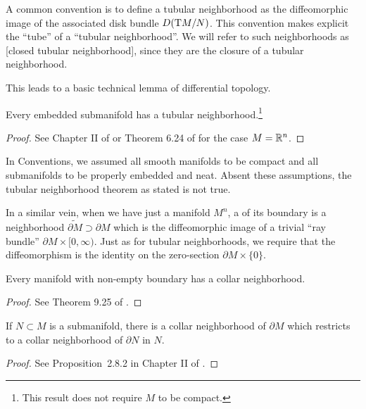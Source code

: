 \begin{remark}
	A common convention is to define a tubular neighborhood as the diffeomorphic image of the associated disk bundle ${D}(\mathrm{T} M/N)$. This convention makes explicit the ``tube'' of a  ``tubular neighborhood''. We will refer to such neighborhoods as [closed tubular neighborhood], since they are the closure of a tubular neighborhood.
\end{remark}

This leads to a basic technical lemma of differential topology.

\begin{theorem}\label{thm:tubular-neighborhood}
	Every embedded submanifold has a tubular neighborhood.\footnote{This result does not require $M$ to be compact.}
\end{theorem}
\begin{proof}
	See Chapter II of \cite{kosinski1993differential} or Theorem 6.24 of \cite{lee2013smooth} for the case $M=\mathbb{R}^n$.
\end{proof}

\begin{warning}
	In Conventions, we assumed all smooth manifolds to be compact and all submanifolds to be properly embedded and neat. Absent these assumptions, the tubular neighborhood theorem as stated is not true.
\end{warning}

In a similar vein, when we have just a manifold $M^n$, a  of its boundary is a neighborhood $\widetilde{\partial M}\supset \partial M$ which is the diffeomorphic image of a trivial ``ray bundle'' $\partial M\times [0,\infty)$. Just as for tubular neighborhoods, we require that the diffeomorphism is the identity on the zero-section $\partial M\times\{0\}$.

\begin{theorem}\label{thm:collar-neighborhood}
	Every manifold with non-empty boundary has a collar neighborhood.
\end{theorem}
\begin{proof}
	See Theorem 9.25 of \cite{lee2013smooth}.
\end{proof}

\begin{proposition}
	If $N\subset M$ is a submanifold, there is a collar neighborhood of $\partial M$ which restricts to a collar neighborhood of $\partial N$ in $N$.
\end{proposition}
\begin{proof}
	See Proposition~2.8.2 in Chapter II of \cite{kosinski1993differential}.
\end{proof}

